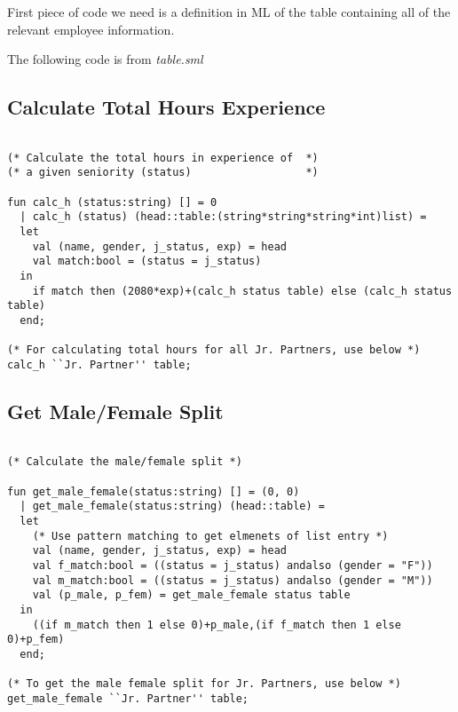 \documentclass{report}
\begin{document}
First piece of code we need is a definition in ML of the table containing
all of the relevant employee information.

The following code is from \emph{table.sml}


\subsection{Calculate Total Hours Experience}
\label{sec:calc-total-hours}

\lstset{frameround=fftt}
\begin{lstlisting}[frame=tRBL]

(* Calculate the total hours in experience of  *) 
(* a given seniority (status)                  *)

fun calc_h (status:string) [] = 0
  | calc_h (status) (head::table:(string*string*string*int)list) =
  let
    val (name, gender, j_status, exp) = head
    val match:bool = (status = j_status)
  in
    if match then (2080*exp)+(calc_h status table) else (calc_h status table)
  end;

(* For calculating total hours for all Jr. Partners, use below *)
calc_h ``Jr. Partner'' table;

\end{lstlisting}
\pagebreak
\subsection{Get Male/Female Split}
\label{sec:get-malefemale-split}

\lstset{frameround=fftt}
\begin{lstlisting}[frame=tRBL]

(* Calculate the male/female split *)

fun get_male_female(status:string) [] = (0, 0)
  | get_male_female(status:string) (head::table) =
  let
    (* Use pattern matching to get elmenets of list entry *)
    val (name, gender, j_status, exp) = head
    val f_match:bool = ((status = j_status) andalso (gender = "F"))
    val m_match:bool = ((status = j_status) andalso (gender = "M"))
    val (p_male, p_fem) = get_male_female status table
  in
    ((if m_match then 1 else 0)+p_male,(if f_match then 1 else 0)+p_fem)
  end;

(* To get the male female split for Jr. Partners, use below *)
get_male_female ``Jr. Partner'' table;

\end{lstlisting}
\end{document}

